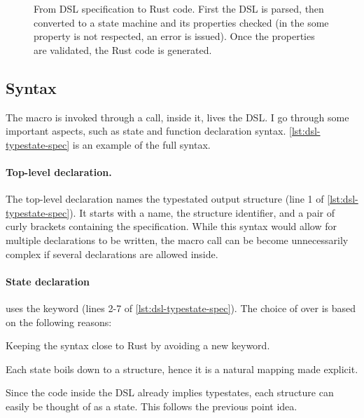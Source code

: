 \begin{figure}
    \caption{
        From DSL specification to Rust code.
        First the DSL is parsed, then converted to a state machine and its properties checked
        (in the some property is not respected, an error is issued).
        Once the properties are validated, the Rust code is generated.
    }
    \label{fig:dsl-processing}
\end{figure}

\subsection{Syntax}

The macro is invoked through a  call, inside it, lives the DSL.
I go through some important aspects, such as state and function declaration syntax.
\autoref{lst:dsl-typestate-spec} is an example of the full syntax.

\paragraph{Top-level declaration.} The top-level declaration names the typestated output structure (line 1 of \autoref{lst:dsl-typestate-spec}).
It starts with a name, the structure identifier, and a pair of curly brackets containing the specification.
While this syntax would allow for multiple declarations to be written,
the macro call can be become unnecessarily complex if several declarations are allowed inside.

\paragraph{State declaration} uses the  keyword (lines 2-7 of \autoref{lst:dsl-typestate-spec}).
The choice of  over  is based on the following reasons:
\begin{compactitem}
    \item Keeping the syntax close to Rust by avoiding a new keyword.
    \item Each state boils down to a structure, hence it is a natural mapping made explicit.
    \item Since the code inside the DSL already implies typestates, each structure can easily be thought of as a state.
    This follows the previous point idea.
\end{compactitem}

